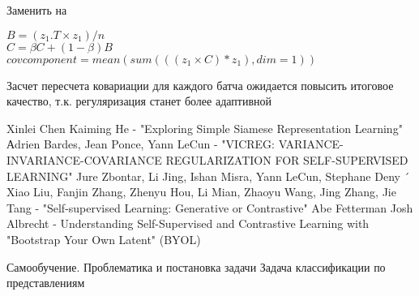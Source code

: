 \documentclass{article}
\begin{document}
Заменить на 

\begin{algorithm}[hbt!]

$B =  (z_1 .T \times z_1 ) / n$ \\
$C = \beta C + (1 - \beta)B$\\

$covcomponent =  mean (sum ((( z_1 \times C) * z_1 ), dim =1))$

Засчет пересчета ковариации для каждого батча ожидается повысить итоговое качество, т.к. регуляризация станет более адаптивной
\end{algorithm}
\newpage
 
 
\begin{thebibliography}{}
      Xinlei Chen Kaiming He  -  "Exploring Simple Siamese Representation Learning"
      Аdrien Bardes, Jean Ponce, Yann LeCun  -  "VICREG: VARIANCE-INVARIANCE-COVARIANCE REGULARIZATION FOR SELF-SUPERVISED LEARNING"
     Jure Zbontar, Li Jing, Ishan Misra, Yann LeCun, Stephane Deny ´
     Xiao Liu, Fanjin Zhang, Zhenyu Hou, Li Mian, Zhaoyu Wang, Jing Zhang, Jie Tang - "Self-supervised Learning: Generative or Contrastive"
     Abe Fetterman
    Josh Albrecht - Understanding Self-Supervised and Contrastive Learning with "Bootstrap Your Own Latent" (BYOL)

     Самообучение. Проблематика и постановка задачи
     Задача классификации по представлениям
\end{thebibliography}
\end{document}
